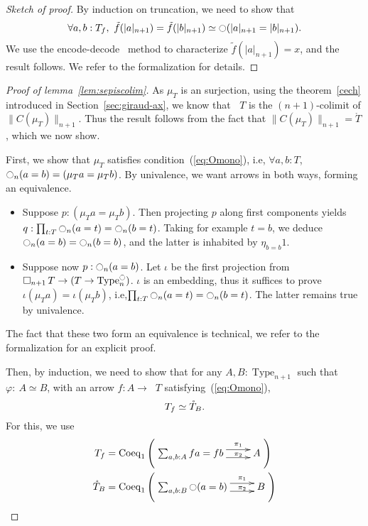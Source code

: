 \documentclass[preprint,9pt,numbers]{sigplanconf}
\makeatletter
\newcommand{\ie}{i.e,\xspace}
\def\dar[#1]#2{\ar@<-#2>[#1]\ar@<#2>[#1]} %
\DeclareMathOperator{\Type}{Type}
\newcommand{\modal}{\ensuremath{\ocircle}}
\newcommand \separated {\mathop{\square_{n+1}} }
\newenvironment{mymath}[1][-0em]{%
  \newcommand\mymathaux{\vspace{#1}}%
  \vspace{#1}%
  \begin{equation*}%
  }{ %
    \mymathaux%
  \end{equation*}}
\makeatother
\begin{document}
\begin{proof}[Sketch of proof]
  By induction on truncation, we need to show that 
  \begin{mymath}\forall a,b:T_f,~\tilde f (|a|_{n+1}) = \tilde f (|b|_{n+1} )\simeq
  \modal (|a|_{n+1}=|b|_{n+1}).\end{mymath}%
  We use the encode-decode~\cite[Section 8.9]{hottbook} method to characterize $\tilde f (|a|_{n+1})
  = x$, and the result follows. We refer to the formalization for details.
\end{proof}

\begin{proof}[Proof of lemma~\ref{lem:sepiscolim}]
  As $\mu_T$ is an surjection, using the theorem~\ref{cech} introduced in Section~\ref{sec:giraud-ax},
  we know that $\separated T$ is the $(n+1)$-colimit of $\|C(\mu_T)\|_{n+1}$. 
  Thus the result follows from the fact that $\|C(\mu_T)\|_{n+1} =
  \mathring T$,
  which we now show.

  First, we show that $\mu_T$ satisfies condition~(\ref{eq:Omono}),
  \ie{} $\forall a,b:T$, $\modal_n (a=b) = (\mu_T a =
  \mu_T b)$. By univalence, we want arrows in both ways, forming an
  equivalence.
  \begin{itemize}
  \item Suppose $p : (\mu_T a = \mu_T b)$. Then projecting $p$ along
    first components yields $q : \prod_{t:T} \modal_n(a=t) = \modal_n (b=t)
    $.
    Taking for example $t=b$, we deduce $\modal_n (a=b) = \modal_n(b=b)$,
    and the latter is inhabited by $\eta_{b=b} 1$.
  \item Suppose now $p : \modal_n(a=b)$. Let $\iota$ be the first
    projection from $\separated T \to (T \to \Type_n^\modal)$. $\iota$ is
    an embedding, thus it suffices to prove $\iota (\mu_T a) = \iota
    (\mu_T b)$, \ie $\prod_{t:T}\modal_n (a=t) = \modal_n (b=t)$. The latter
    remains true by univalence.
  \end{itemize}
  The fact that these two form an equivalence is technical, we refer to
  the formalization for an explicit proof.

  Then, by induction, we need to show that for any $A,B:\Type_{n+1}$ such
  that $\varphi:~A \simeq B$, with an arrow $f:A \to \separated T$
  satisfying~(\ref{eq:Omono}), 
  \begin{mymath}T_f \simeq \mathring T_B.\end{mymath}%
  For this, we use 
  \begin{align*}
    T_f &= \mathrm{Coeq}_1 \left( 
          \xymatrix{
          \sum_{a,b:A} f a = f b \dar[r]{4pt}^-{\pi_1}_-{\pi_2} & A
  }
                                                                  \right)
    \\
    \mathring T_B &= \mathrm{Coeq}_1 \left( 
                    \xymatrix{\sum_{a,b:B} \modal (a=b) \dar[r]{4pt}^-{\pi_1}_-{\pi_2}
                                                                & B}
                                                                  \right)
  \end{align*}


\end{proof}
\end{document}
